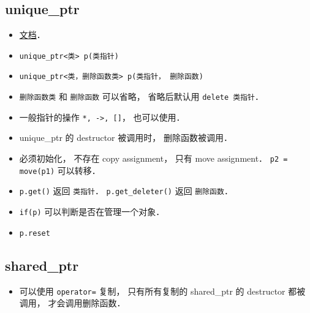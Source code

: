 
\begin{issues}
\issueDraft
\end{issues}

\subsection{unique_ptr}
\begin{itemize}
\item \href{https://en.cppreference.com/w/cpp/memory/unique_ptr}{文档}．
\item \verb|unique_ptr<类> p(类指针)|
\item \verb|unique_ptr<类，删除函数类> p(类指针， 删除函数)|
\item \verb|删除函数类| 和 \verb|删除函数| 可以省略， 省略后默认用 \verb|delete 类指针|．
\item 一般指针的操作 \verb|*, ->, []|， 也可以使用．
\item unique_ptr 的 destructor 被调用时， 删除函数被调用．
\item 必须初始化， 不存在 copy assignment， 只有 move assignment． \verb|p2 = move(p1)| 可以转移．
\item \verb|p.get()| 返回 \verb|类指针|． \verb|p.get_deleter()| 返回 \verb|删除函数|．
\item \verb|if(p)| 可以判断是否在管理一个对象．
\item \verb|p.reset|
\end{itemize}

\subsection{shared_ptr}
\begin{itemize}
\item 可以使用 \verb|operator=| 复制， 只有所有复制的 shared_ptr 的 destructor 都被调用， 才会调用删除函数．
\end{itemize}
